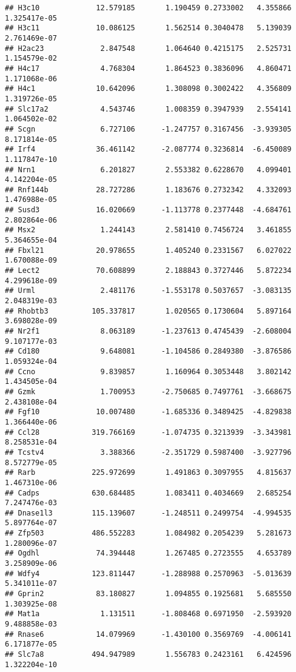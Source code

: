 \documentclass[
]{article}
\begin{document}
\begin{verbatim}
## H3c10             12.579185       1.190459 0.2733002   4.355866 1.325417e-05
## H3c11             10.086125       1.562514 0.3040478   5.139039 2.761469e-07
## H2ac23             2.847548       1.064640 0.4215175   2.525731 1.154579e-02
## H4c17              4.768304       1.864523 0.3836096   4.860471 1.171068e-06
## H4c1              10.642096       1.308098 0.3002422   4.356809 1.319726e-05
## Slc17a2            4.543746       1.008359 0.3947939   2.554141 1.064502e-02
## Scgn               6.727106      -1.247757 0.3167456  -3.939305 8.171814e-05
## Irf4              36.461142      -2.087774 0.3236814  -6.450089 1.117847e-10
## Nrn1               6.201827       2.553382 0.6228670   4.099401 4.142204e-05
## Rnf144b           28.727286       1.183676 0.2732342   4.332093 1.476988e-05
## Susd3             16.020669      -1.113778 0.2377448  -4.684761 2.802864e-06
## Msx2               1.244143       2.581410 0.7456724   3.461855 5.364655e-04
## Fbxl21            20.978655       1.405240 0.2331567   6.027022 1.670088e-09
## Lect2             70.608899       2.188843 0.3727446   5.872234 4.299618e-09
## Urml               2.481176      -1.553178 0.5037657  -3.083135 2.048319e-03
## Rhobtb3          105.337817       1.020565 0.1730604   5.897164 3.698028e-09
## Nr2f1              8.063189      -1.237613 0.4745439  -2.608004 9.107177e-03
## Cd180              9.648081      -1.104586 0.2849380  -3.876586 1.059324e-04
## Ccno               9.839857       1.160964 0.3053448   3.802142 1.434505e-04
## Gzmk               1.700953      -2.750685 0.7497761  -3.668675 2.438108e-04
## Fgf10             10.007480      -1.685336 0.3489425  -4.829838 1.366440e-06
## Ccl28            319.766169      -1.074735 0.3213939  -3.343981 8.258531e-04
## Tcstv4             3.388366      -2.351729 0.5987400  -3.927796 8.572779e-05
## Rarb             225.972699       1.491863 0.3097955   4.815637 1.467310e-06
## Cadps            630.684485       1.083411 0.4034669   2.685254 7.247476e-03
## Dnase1l3         115.139607      -1.248511 0.2499754  -4.994535 5.897764e-07
## Zfp503           486.552283       1.084982 0.2054239   5.281673 1.280096e-07
## Ogdhl             74.394448       1.267485 0.2723555   4.653789 3.258909e-06
## Wdfy4            123.811447      -1.288988 0.2570963  -5.013639 5.341011e-07
## Gprin2            83.180827       1.094855 0.1925681   5.685550 1.303925e-08
## Mat1a              1.131511      -1.808468 0.6971950  -2.593920 9.488858e-03
## Rnase6            14.079969      -1.430100 0.3569769  -4.006141 6.171877e-05
## Slc7a8           494.947989       1.556783 0.2423161   6.424596 1.322204e-10

\end{verbatim}
\end{document}

